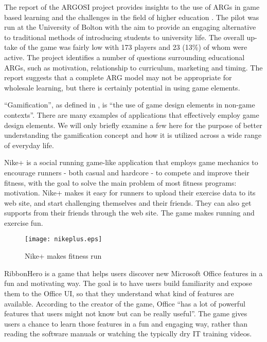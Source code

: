 The report of the ARGOSI project provides insights to the use of ARGs in game
based learning and the challenges in the field of higher education
\cite{whitton2009alternate}. The pilot was run at the University of Bolton with
the aim to provide an engaging alternative to traditional methods of
introducing students to university life. The overall up-take of the game was
fairly low with 173 players and 23 (13\%) of whom were active. The project
identifies a number of questions surrounding educational ARGs, such as
motivation, relationship to curriculum, marketing and timing. The report
suggests that a complete ARG model may not be appropriate for wholesale
learning, but there is certainly potential in using game elements.

``Gamification'', as defined in \cite {Deterding2011mt}, is ``the use of game design elements in non-game contexts''. 
There are many examples of applications that effectively employ game design elements. We will only briefly examine a few here for the purpose of better understanding the gamification concept and how it is utilized across a wide range of everyday life. 

Nike+ \cite{nikeplus} is a social running game-like application that employs game mechanics to encourage runners - both casual and hardcore - to compete and improve their fitness, with the goal to solve the main problem of most fitness programs: motivation. Nike+ makes it easy for runners to upload their exercise data to its web site, and start challenging themselves and their friends. They can also get supports from their friends through the web site. The game makes running and exercise fun.

\begin{figure}[htbp]
	\centering
		\texttt{[image: nikeplus.eps]}
		\caption{Nike+ makes fitness run}
		\label{fig:nikeplus}
\end{figure}

RibbonHero \cite{ribbonhero} is a game that helps users discover new Microsoft Office features in a fun and motivating way. The goal is to have users build familiarity and expose them to the Office UI, so that they understand what kind of features are available. According to the creator of the game, Office ``has a lot of powerful features that users might not know but can be really useful''. The game gives users a chance to learn those features in a fun and engaging way, rather than reading the software manuals or watching the typically dry IT training videos.

